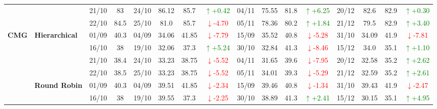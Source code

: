 {\begin{longtable}{llcc|cccc|cccc|cccc}
&
& 21/10 & 83 & 24/10 & 86.12 & 85.7 & \textcolor{green}{\(\uparrow\)+0.42} & 04/11 & 75.55 & 81.8 & \textcolor{green}{\(\uparrow\)+6.25} & 20/12 & 82.6 & 82.9 & \textcolor{green}{\(\uparrow\)+0.30} \\

&
& 22/10 & 84.5 & 25/10 & 81.0 & 85.7 & \textcolor{red}{\(\downarrow\)-4.70} & 05/11 & 78.36 & 80.2 & \textcolor{green}{\(\uparrow\)+1.84} & 21/12 & 79.5 & 82.9 & \textcolor{green}{\(\uparrow\)+3.40} \\
\midrule






\multirow{12}{*}{\textbf{CMG}} 
& \textbf{Hierarchical}
& 01/09 & 40.3 & 04/09 & 34.06 & 41.85 & \textcolor{red}{\(\downarrow\)-7.79} & 15/09 & 35.52 & 40.8 & \textcolor{red}{\(\downarrow\)-5.28} & 31/10 & 34.09 & 41.9 & \textcolor{red}{\(\downarrow\)-7.81} \\

& 
& 16/10 & 38 & 19/10 & 32.06 & 37.3 & \textcolor{green}{\(\uparrow\)+5.24} & 30/10 & 32.84 & 41.3 & \textcolor{red}{\(\downarrow\)-8.46} & 15/12 & 34.0 & 35.1 & \textcolor{green}{\(\uparrow\)+1.10} \\

& 
& 21/10 & 38.4 & 24/10 & 33.23 & 38.75 & \textcolor{red}{\(\downarrow\)-5.52} & 04/11 & 31.65 & 39.6 & \textcolor{red}{\(\downarrow\)-7.95} & 20/12 & 32.58 & 35.2 & \textcolor{green}{\(\uparrow\)+2.62} \\

&
& 22/10 & 38.5 & 25/10 & 33.23 & 38.75 & \textcolor{red}{\(\downarrow\)-5.52} & 05/11 & 34.01 & 39.3 & \textcolor{red}{\(\downarrow\)-5.29} & 21/12 & 32.59 & 35.2 & \textcolor{green}{\(\uparrow\)+2.61} \\
\cmidrule(lr){2-16}


& \textbf{Round Robin}
& 01/09 & 40.3 & 04/09 & 39.51 & 41.85 & \textcolor{red}{\(\downarrow\)-2.34} & 15/09 & 39.46 & 40.8 & \textcolor{red}{\(\downarrow\)-1.34} & 31/10 & 39.43 & 41.9 & \textcolor{red}{\(\downarrow\)-2.47} \\

& 
& 16/10 & 38 & 19/10 & 39.55 & 37.3 & \textcolor{red}{\(\downarrow\)-2.25} & 30/10 & 38.89 & 41.3 & \textcolor{green}{\(\uparrow\)+2.41} & 15/12 & 30.15 & 35.1 & \textcolor{green}{\(\uparrow\)+4.95} \\


\end{longtable}}
